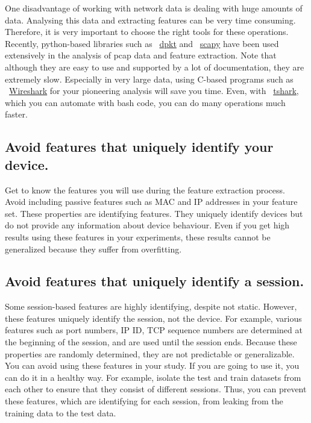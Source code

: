 \documentclass[journal]{IEEEtran}
\begin{document}
One disadvantage of working with network data is dealing with huge amounts of data. Analysing this data and extracting features can be very time consuming. Therefore, it is very important to choose the right tools for these operations. Recently, python-based libraries such as ~\href{https://dpkt.readthedocs.io/en/latest/}{dpkt} and ~\href{https://scapy.net/}{scapy} have been used extensively in the analysis of pcap data and feature extraction. Note that although they are easy to use and supported by a lot of documentation, they are extremely slow. Especially in very large data, using C-based programs such as ~\href{https://www.wireshark.org/}{Wireshark} for your pioneering analysis will save you time. Even, with ~\href{https://www.wireshark.org/docs/man-pages/tshark.html}{tshark}, which you can automate with bash code, you can do many operations much faster.

\subsection{Avoid features that uniquely identify your device.}
Get to know the features you will use during the feature extraction process. Avoid including passive features such as MAC and IP addresses in your feature set. These properties are identifying features. They uniquely identify devices but do not provide any information about device behaviour. Even if you get high results using these features in your experiments, these results cannot be generalized because they suffer from overfitting.
\subsection{Avoid features that uniquely identify a session.}
Some session-based features are highly identifying, despite not static. However, these features uniquely identify the session, not the device. For example, various features such as port numbers, IP ID, TCP sequence numbers are determined at the beginning of the session, and are used until the session ends. Because these properties are randomly determined, they are not predictable or generalizable. You can avoid using these features in your study. If you are going to use it, you can do it in a healthy way. For example, isolate the test and train datasets from each other to ensure that they consist of different sessions. Thus, you can prevent these features, which are identifying for each session, from leaking from the training data to the test data.
\end{document}
